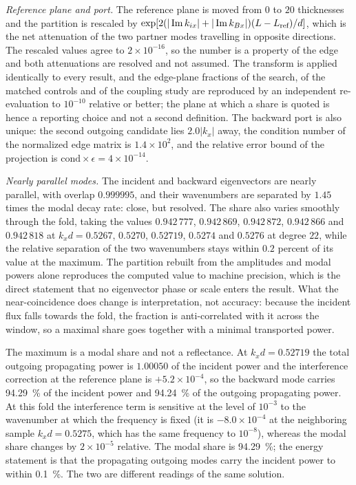 \emph{Reference plane and port.}  The reference plane is moved from $0$ to $20$
thicknesses and the partition is rescaled by
$\exp[2(|\operatorname{Im} k_{ix}|+|\operatorname{Im} k_{Bx}|)(L-L_{\text{ref}})/d]$, which is the net
attenuation of the two partner modes travelling in opposite directions.  The
rescaled values agree to $2\times10^{-16}$, so the number is a property of the
edge and both attenuations are resolved and not assumed.  The transform is
applied identically to every result, and the edge-plane
fractions of the search, of the matched controls and of the coupling study
are reproduced by an independent re-evaluation to $10^{-10}$ relative or better; the plane at
which a share is quoted is hence a reporting choice and not a second
definition.  The backward port
is also unique: the second outgoing candidate lies $2.0|k_x|$ away, the
condition number of the normalized edge matrix is $1.4\times10^{2}$, and the
relative error bound of the projection is $\text{cond}\times\epsilon=4\times10^{-14}$.

\emph{Nearly parallel modes.}  The incident and backward eigenvectors
are nearly parallel, with overlap $0.999995$, and their wavenumbers are
separated by $1.45$ times the modal decay rate: close, but resolved.  The share also varies smoothly through the fold, taking the values $0.942\,777$, $0.942\,869$, $0.942\,872$, $0.942\,866$ and $0.942\,818$ at $k_xd=0.5267$, $0.5270$, $0.52719$, $0.5274$ and $0.5276$ at degree $22$, while the relative separation of the two wavenumbers stays within $0.2$ percent of its value at the maximum.  The
partition rebuilt from the amplitudes and modal powers alone reproduces the computed value to machine precision, which is the direct statement that no
eigenvector phase or scale enters the result.  What the near-coincidence does
change is interpretation, not accuracy: because the incident flux falls towards
the fold, the fraction is anti-correlated with it across the window, so a maximal share goes together with a minimal transported power.

The maximum is a modal share and not a reflectance.  At $k_xd=0.52719$ the
total outgoing propagating power is $1.00050$ of the incident power and the
interference correction at the reference plane is $+5.2\times10^{-4}$, so the
backward mode carries \SI{94.29}{\percent} of the incident power and
\SI{94.24}{\percent} of the outgoing propagating power.  At this fold the
interference term is sensitive at the level of $10^{-3}$ to the wavenumber at which the
frequency is fixed (it is $-8.0\times10^{-4}$ at the neighboring sample $k_xd=0.5275$, which has the same frequency to $10^{-8}$), whereas the modal share changes by $2\times10^{-5}$ relative.  The modal share is
\SI{94.29}{\percent}; the energy statement is that the propagating outgoing
modes carry the incident power to within \SI{0.1}{\percent}.  The two are different readings of the same
solution.

